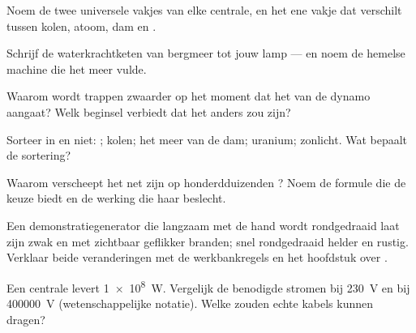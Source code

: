 \begin{exercise}[$\star$]\label{exo:g9:alternator:4}
Noem de twee universele vakjes van elke centrale, en het ene vakje dat
verschilt tussen kolen, atoom, dam en .
\end{exercise}

\begin{exercise}[$\star$]\label{exo:g9:alternator:5}
Schrijf de waterkrachtketen van bergmeer tot jouw lamp --- en noem de
hemelse machine die het meer vulde.
\end{exercise}

\begin{exercise}[$\star$]\label{exo:g9:alternator:6}
Waarom wordt trappen zwaarder op het moment dat het  van de
dynamo aangaat? Welk beginsel verbiedt dat het anders zou zijn?
\end{exercise}

\begin{exercise}[$\star$]\label{exo:g9:alternator:7}
Sorteer in  en niet: ; kolen; het
meer van de dam; uranium; zonlicht. Wat bepaalt de sortering?
\end{exercise}

\begin{exercise}[$\star$]\label{exo:g9:alternator:8}
Waarom verscheept het net zijn  op honderdduizenden
? Noem de formule die de keuze biedt en de werking die
haar beslecht.
\end{exercise}

\begin{exercise}[$\star\star$]\label{exo:g9:alternator:9}
Een demonstratiegenerator die langzaam met de hand wordt rondgedraaid
laat zijn  zwak en met zichtbaar geflikker
branden; snel rondgedraaid helder en rustig. Verklaar beide
veranderingen met de werkbankregels en het hoofdstuk over
.
\end{exercise}

\begin{exercise}[$\star\star$]\label{exo:g9:alternator:10}
Een centrale levert \qty{1e8}{W}. Vergelijk de benodigde stromen bij
\qty{230}{V} en bij \qty{400000}{V} (wetenschappelijke notatie). Welke
zouden echte kabels kunnen dragen?
\end{exercise}

